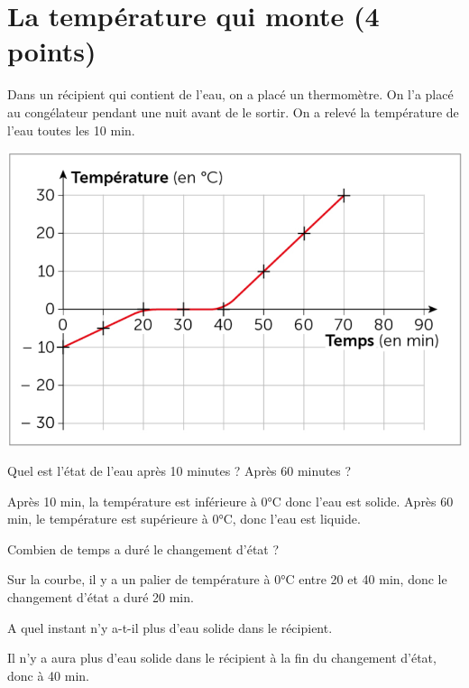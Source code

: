 \section{La température qui monte (4 points)}\label{ex:fusion}

Dans un récipient qui contient de l'eau, on a placé un thermomètre. On l'a placé au congélateur pendant une nuit avant de le sortir. On a relevé la température de l'eau toutes les 10 min.

\begin{center}
	\includegraphics[scale=0.4]{./img/courbe}
\end{center}

\begin{questions}
	\question[2] Quel est l'état de l'eau après 10 minutes ? Après 60 minutes ?
	\begin{solution}
		Après 10 min, la température est inférieure à 0°C donc l'eau est solide. Après 60 min, le température est supérieure à 0°C, donc l'eau est liquide.
	\end{solution}
	
	\question[1] Combien de temps a duré le changement d'état ?
	\begin{solution}
		Sur la courbe, il y a un palier de température à 0°C entre 20 et 40 min, donc le changement d'état a duré 20 min.
	\end{solution}
	
	\question[1] A quel instant n'y a-t-il plus d'eau solide dans le récipient. 
	\begin{solution}
		Il n'y a aura plus d'eau solide dans le récipient à la fin du changement d'état, donc à 40 min.
	\end{solution}
\end{questions}